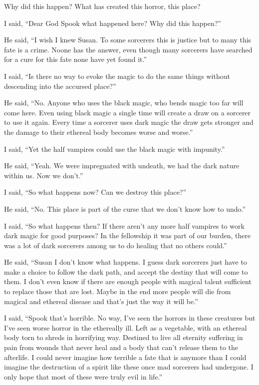 Why did this happen? What has created this horror, this place?

I said, ``Dear God Spook what happened here? Why did this happen?''

He said, ``I wish I knew Susan. To some sorcerers this is justice but to many this fate is a crime. Noone has the answer, even though many sorcerers have searched for a cure for this fate none have yet found it.''

I said, ``Is there no way to evoke the magic to do the same things without descending into the accursed place?''

He said, ``No. Anyone who uses the black magic, who bends magic too far will come here. Even using black magic a single time will create a draw on a sorcerer to use it again. Every time a sorcerer uses dark magic the draw gets stronger and the damage to their ethereal body becomes worse and worse.''

I said, ``Yet the half vampires could use the black magic with impunity.''

He said, ``Yeah. We were impregnated with undeath, we had the dark nature within us. Now we don't.''

I said, ``So what happens now? Can we destroy this place?''

He said, ``No. This place is part of the curse that we don't know how to undo.''

I said, ``So what happens then? If there aren't any more half vampires to work dark magic for good purposes? In the fellowship it was part of our burden, there was a lot of dark sorcerers among us to do healing that no others could.''

He said, ``Susan I don't know what happens. I guess dark sorcerers just have to make a choice to follow the dark path, and accept the destiny that will come to them. I don't even know if there are enough people with magical talent sufficient to replace those that are lost. Maybe in the end more people will die from magical and ethereal disease and that's just the way it will be.''

I said, ``Spook that's horrible. No way, I've seen the horrors in these creatures but I've seen worse horror in the ethereally ill. Left as a vegetable, with an ethereal body torn to shreds in horrifying way. Destined to live all eternity suffering in pain from wounds that never heal and a body that can't release them to the afterlife. I could never imagine how terrible a fate that is anymore than I could imagine the destruction of a spirit like these once mad sorcerers had undergone. I only hope that most of these were truly evil in life.''

